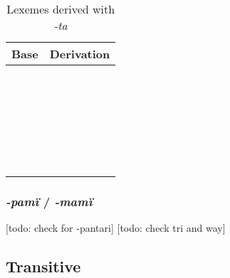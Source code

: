 \documentclass{memoir}
\begin{document}
\begin{table}
\caption{Lexemes derived with \emph{-ta}}
\label{tab:tavbz}
\centering
\begin{tabular}{ll}
\toprule
Base & Derivation \\
\midrule
     &            \\
     &            \\
     &            \\
     &            \\
     &            \\
     &            \\
     &            \\
     &            \\
     &            \\
     &            \\
     &            \\
     &            \\
     &            \\
     &            \\
     &            \\
     &            \\
     &            \\
     &            \\
     &            \\
     &            \\
     &            \\
     &            \\
     &            \\
     &            \\
     &            \\
     &            \\
\bottomrule
\end{tabular}

\end{table}

\subsubsection{\texorpdfstring{\emph{-pamï} /
\emph{-mamï}}{-pamï / -mamï}}

{[}todo: check for -pantari{]} {[}todo: check tri and way{]}

\subsection{Transitive}
\end{document}
